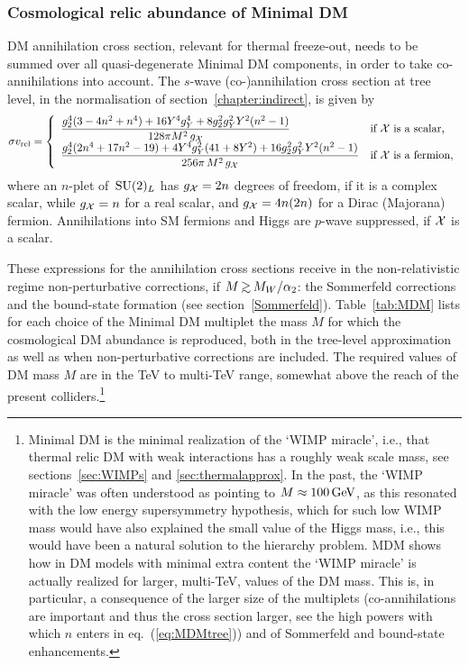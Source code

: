 \subsubsection{Cosmological relic abundance of Minimal DM}
DM annihilation cross section, relevant for thermal freeze-out, needs to be summed over all
quasi-degenerate Minimal DM components, in order to take co-annihilations into account.
The $s$-wave (co-)annihilation cross section at tree level, in the normalisation of section~\ref{chapter:indirect}, is given by
\begin{equation}\label{eq:MDMtree}
\sigma v_{\rm rel} =\left\{\begin{array}{ll}\displaystyle
\frac{g_2^4 (3-4n^2+n^4) + 16 Y^4 g_Y^4 + 8g_2^2 g_Y^2 Y^2 (n^2-1)}{128 \pi M^2 \, g_{\cal X}}
&\hbox{if ${\cal X}$ is a scalar,}\\[2mm]
\displaystyle
\frac{g_2^4 (2n^4+17n^2-19) + 4  Y^4 g_Y^2 (41+8Y^2)+16g_2^2 g_Y^2 Y^2 (n^2-1)}{256\pi\, M^2\, g_{\cal X}}
&\hbox{if ${\cal X}$ is a fermion,}
\end{array}\right.
 \end{equation}
where an $n$-plet of $\,{\rm SU}(2)_L$ has 
$g_{\cal X} = 2n$ degrees of freedom, if it is a complex scalar, while
$g_{\cal X}=n$ for a real scalar, and
 $g_{\cal X}=4n (2n)$ for a Dirac (Majorana) fermion.
Annihilations into SM fermions and Higgs are $p$-wave suppressed, if ${\cal X}$ is a scalar.

These expressions for the annihilation cross sections receive in the non-relativistic regime non-pertur\-bative corrections, if  $M \circa{>}M_W/\alpha_2$:
the Sommerfeld corrections and the bound-state formation (see section~\ref{Sommerfeld}).
Table~\ref{tab:MDM} lists for each choice of the Minimal DM multiplet the mass $M$ for which the cosmological DM abundance is reproduced, both 
in the tree-level approximation as well as when non-perturbative corrections are included. The required values of DM mass $M$ are in the TeV to multi-TeV range, somewhat above the reach of the present colliders.\footnote{
Minimal DM is the minimal realization of the `WIMP miracle', i.e., that thermal relic DM with weak interactions has a roughly weak scale mass, see sections~\ref{sec:WIMPs} and \ref{sec:thermalapprox}. 
In the past, the `WIMP miracle' was often understood as pointing to $M\approx 100\,{\rm GeV} $, as this resonated with the low energy supersymmetry hypothesis, which for such low WIMP mass would have also explained the small value of the Higgs mass, i.e., this would have been a natural solution to the hierarchy problem. 
MDM shows how in DM models with minimal extra content the `WIMP miracle' is actually realized for larger, multi-TeV, values of the DM mass. This is, in particular, a consequence of the larger size of the multiplets (co-annihilations are important and thus the cross section larger, see the high powers with which $n$ enters in eq.~(\ref{eq:MDMtree})) and of Sommerfeld and bound-state enhancements.}




